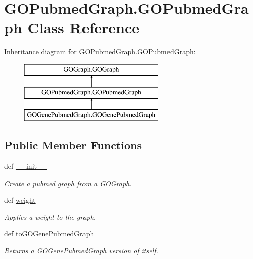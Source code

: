 \hypertarget{class_g_o_pubmed_graph_1_1_g_o_pubmed_graph}{
\section{GOPubmedGraph.GOPubmedGraph Class Reference}
\label{class_g_o_pubmed_graph_1_1_g_o_pubmed_graph}
}
Inheritance diagram for GOPubmedGraph.GOPubmedGraph:\begin{figure}[H]
\begin{center}
\leavevmode
\includegraphics[height=3.000000cm]{class_g_o_pubmed_graph_1_1_g_o_pubmed_graph}
\end{center}
\end{figure}
\subsection*{Public Member Functions}
\begin{DoxyCompactItemize}
\item 
def \hyperlink{class_g_o_pubmed_graph_1_1_g_o_pubmed_graph_a67014838ca4e64ab6302e109cfb38baa}{\_\-\_\-init\_\-\_\-}
\begin{DoxyCompactList}\small\item\em Create a pubmed graph from a GOGraph. \item\end{DoxyCompactList}\item 
\hypertarget{class_g_o_pubmed_graph_1_1_g_o_pubmed_graph_a1cd7af1343cfc3228db50e62ad1d79be}{
def \hyperlink{class_g_o_pubmed_graph_1_1_g_o_pubmed_graph_a1cd7af1343cfc3228db50e62ad1d79be}{weight}}
\label{class_g_o_pubmed_graph_1_1_g_o_pubmed_graph_a1cd7af1343cfc3228db50e62ad1d79be}

\begin{DoxyCompactList}\small\item\em Applies a weight to the graph. \item\end{DoxyCompactList}\item 
def \hyperlink{class_g_o_pubmed_graph_1_1_g_o_pubmed_graph_a9c455a5443e6be4986d7bfbc1ef874c2}{toGOGenePubmedGraph}
\begin{DoxyCompactList}\small\item\em Returns a GOGenePubmedGraph version of itself. \item\end{DoxyCompactList}\end{DoxyCompactItemize}


